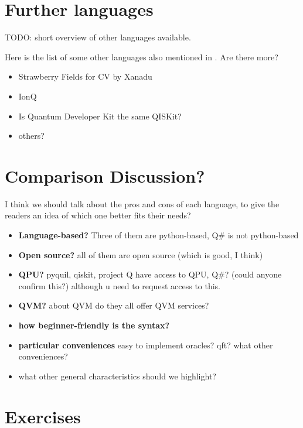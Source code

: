 \section{Further languages}

TODO: short overview of other languages available.

Here is the list of some other languages also mentioned in \cite{RL2018}. Are there more?
\begin{itemize}
    \item Strawberry Fields for CV by Xanadu \cite{Xanadu2018}
    \item IonQ \cite{IonQ}
    \item Is Quantum Developer Kit the same QISKit?
    \item others?
\end{itemize}

\section{Comparison Discussion?}

I think we should talk about the pros and cons of each language, to give the readers an idea of which one better fits their needs?
\begin{itemize}
    \item {\bf Language-based?} Three of them are python-based, Q\# is not python-based
    \item {\bf Open source?} all of them are open source (which is good, I think)
    \item {\bf QPU?} pyquil, qiskit, project Q have access to QPU, Q\#? (could anyone confirm this?) although u need to request access to this.
    \item {\bf QVM?} about QVM do they all offer QVM services?
    \item {\bf how beginner-friendly is the syntax?}
    \item {\bf particular conveniences} easy to implement oracles? qft? what other conveniences?
    \item what other general characteristics should we highlight?
\end{itemize}


\newpage
\section{Exercises}

